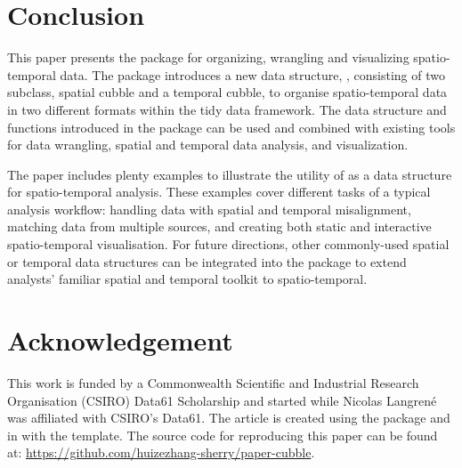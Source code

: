 \documentclass[
  shortnames]{jss}
\begin{document}
\hypertarget{conclude}{%
\section{Conclusion}\label{conclude}}

This paper presents the  package  for organizing, wrangling and visualizing spatio-temporal data. The package introduces a new data structure, , consisting of two subclass, spatial cubble and a temporal cubble, to organise spatio-temporal data in two different formats within the tidy data framework. The data structure and functions introduced in the package can be used and combined with existing tools for data wrangling, spatial and temporal data analysis, and visualization.

The paper includes plenty examples to illustrate the utility of  as a data structure for spatio-temporal analysis. These examples cover different tasks of a typical analysis workflow: handling data with spatial and temporal misalignment, matching data from multiple sources, and creating both static and interactive spatio-temporal visualisation. For future directions, other commonly-used spatial or temporal data structures can be integrated into the  package to extend analysts' familiar spatial and temporal toolkit to spatio-temporal.

\hypertarget{acknowledgement}{%
\section{Acknowledgement}\label{acknowledgement}}

This work is funded by a Commonwealth Scientific and Industrial Research Organisation (CSIRO) Data61 Scholarship and started while Nicolas Langrené was affiliated with CSIRO's Data61. The article is created using the package  \citep{knitr} and  \citep{rmarkdown} in  with the  template. The source code for reproducing this paper can be found at: \url{https://github.com/huizezhang-sherry/paper-cubble}.


\end{document}
